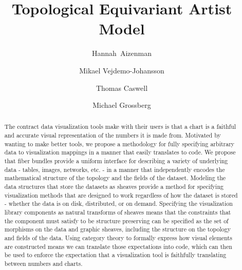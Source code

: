 \documentclass[11pt,titlepage]{amsart}
\begin{document}
\title[]{Topological Equivariant Artist Model}

\author{Hannah~Aizenman}
\address{The Graduate Center, CUNY \\NY, NY, USA}

\author{Mikael Vejdemo-Johansson}
\address{The Graduate Center, CUNY\\NY, NY, USA}


\author{Thomas Caswell}
\address{National Synchrotron Light Source II, Brookhaven National Lab\\ Upton, NY, USA}
\author{Michael Grossberg}
\address{The Graduate Center, CUNY\\NY, NY, USA}


\begin{abstract}
    The contract data visualization tools make with their users is that a chart is a faithful and accurate visual representation of the numbers it is made from. Motivated by wanting to make better tools, we propose a methodology for fully specifying arbitrary data to visualization mappings in a manner that easily translates to code. We propose that fiber bundles provide a uniform interface for describing a variety of underlying data - tables, images, networks, etc. - in a manner that independently encodes the mathematical structure of the topology and the fields of the dataset. Modeling the data structures that store the datasets as sheaves provide a method for specifying visualization methods that are designed to work regardless of how the dataset is stored - whether the data is on disk, distributed, or on demand. Specifying the visualization library components as natural transforms of sheaves means that the constraints that the component must satisfy to be structure preserving can be specified as the set of morphisms on the data and graphic sheaves, including the structure on the topology and fields of the data.
    Using category theory to formally express how visual elements are constructed means we can translate those expectations into code, which can then be used to enforce the expectation that a visualization tool is faithfully translating between numbers and charts.
\end{abstract}

\maketitle
\end{document}
